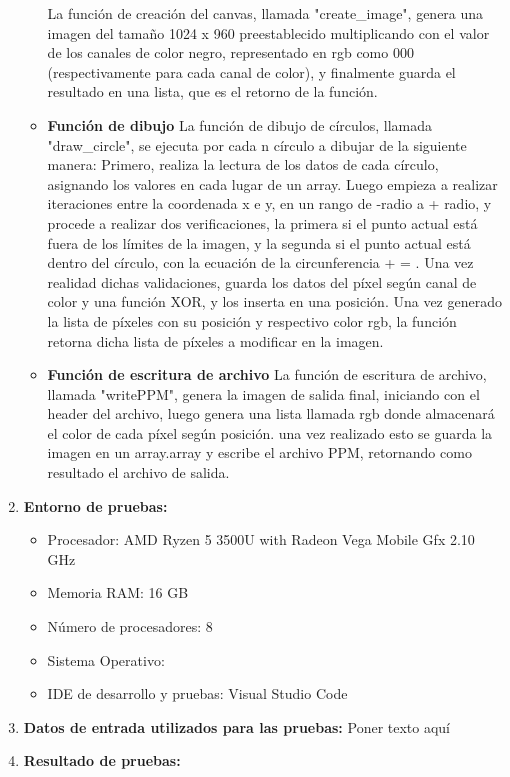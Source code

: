 \documentclass[12pt, letterpaper]{article}
\begin{document}
\begin{flushleft}
\begin{enumerate}
\begin{itemize}
            La función de creación del canvas, llamada "create_image", genera una imagen del tamaño 1024 x 960 preestablecido multiplicando con el valor de los canales de color negro, representado en rgb como 000 (respectivamente para cada canal de color), y finalmente guarda el resultado en una lista, que es el retorno de la función.
            \item \textbf{Función de dibujo}
            La función de dibujo de círculos, llamada "draw_circle", se ejecuta por cada n círculo a dibujar de la siguiente manera: Primero, realiza la lectura de los datos de cada círculo, asignando los valores en cada lugar de un array. Luego empieza a realizar iteraciones entre la coordenada x e y, en un rango de -radio a + radio, y procede a realizar dos verificaciones, la primera si el punto actual está fuera de los límites de la imagen, y la segunda si el punto actual está dentro del círculo, con la ecuación de la circunferencia  +  = . Una vez realidad dichas validaciones, guarda los datos del píxel según canal de color y una función XOR, y los inserta en una posición. Una vez generado la lista de píxeles con su posición y respectivo color rgb, la función retorna dicha lista de píxeles a modificar en la imagen.
            \item \textbf{Función de escritura de archivo}
            La función de escritura de archivo, llamada "writePPM", genera la imagen de salida final, iniciando con el header del archivo, luego genera una lista llamada rgb donde almacenará el color de cada píxel según posición. una vez realizado esto se guarda la imagen en un array.array y escribe el archivo PPM, retornando como resultado el archivo de salida.
        \end{itemize}

        \vspace{10mm}
        \item \textbf{Entorno de pruebas:}
            \begin{itemize}
                \item Procesador: AMD Ryzen 5 3500U with Radeon Vega Mobile Gfx  2.10 GHz
                \item Memoria RAM: 16 GB
                \item Número de procesadores: 8
                \item Sistema Operativo: 
                \item IDE de desarrollo y pruebas: Visual Studio Code
            \end{itemize}
        \item \textbf{Datos de entrada utilizados para las pruebas:}
        Poner texto aquí
        \item \textbf{Resultado de pruebas:}
    \end{enumerate}
\end{flushleft}
\end{document}
